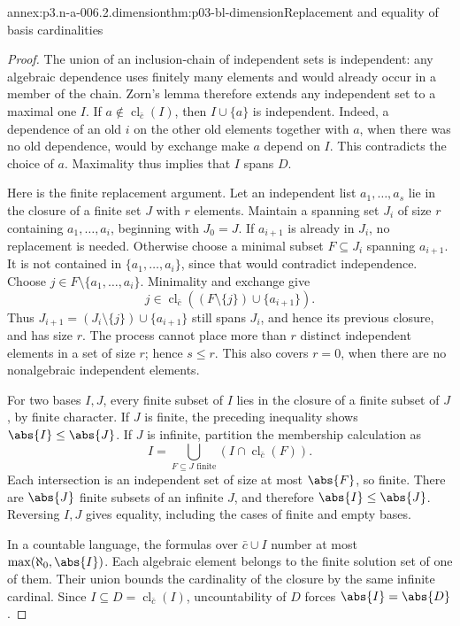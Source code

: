 \begin{annexitem}{annex:p3.n-a-006.2.dimension}{thm:p03-bl-dimension}{Replacement and equality of basis cardinalities}
\begin{proof}
The union of an inclusion-chain of independent sets is independent: any
algebraic dependence uses finitely many elements and would already occur
in a member of the chain. Zorn's lemma therefore extends any independent
set to a maximal one \(I\). If \(a\notin\operatorname{cl}_{\bar c}(I)\),
then \(I\cup\{a\}\) is independent. Indeed, a dependence of an old
\(i\) on the other old elements together with \(a\), when there was
no old dependence, would by exchange make \(a\) depend on \(I\).
This contradicts the choice of \(a\). Maximality thus implies that
\(I\) spans \(D\).

Here is the finite replacement argument. Let an independent list
\(a_1,\ldots,a_s\) lie in the closure of a finite set \(J\) with
\(r\) elements. Maintain a spanning set \(J_i\) of size \(r\)
containing \(a_1,\ldots,a_i\), beginning with \(J_0=J\).
If \(a_{i+1}\) is already in \(J_i\), no replacement is needed.
Otherwise choose a minimal subset \(F\subseteq J_i\) spanning
\(a_{i+1}\). It is not contained in \(\{a_1,\ldots,a_i\}\), since
that would contradict independence. Choose
\(j\in F\setminus\{a_1,\ldots,a_i\}\). Minimality and exchange give
\[
 j\in\operatorname{cl}_{\bar c}
       ((F\setminus\{j\})\cup\{a_{i+1}\}).
\]
Thus \(J_{i+1}=(J_i\setminus\{j\})\cup\{a_{i+1}\}\) still spans
\(J_i\), and hence its previous closure, and has size \(r\).
The process cannot place more than \(r\) distinct independent elements
in a set of size \(r\); hence \(s\leq r\). This also covers
\(r=0\), when there are no nonalgebraic independent elements.

For two bases \(I,J\), every finite subset of \(I\) lies in the
closure of a finite subset of \(J\), by finite character. If \(J\)
is finite, the preceding inequality shows \(\abs{I}\leq\abs{J}\).
If \(J\) is infinite, partition the membership calculation as
\[
 I=\bigcup_{F\subseteq J\text{ finite}}
        (I\cap\operatorname{cl}_{\bar c}(F)).
\]
Each intersection is an independent set of size at most \(\abs{F}\),
so finite. There are \(\abs{J}\) finite subsets of an infinite \(J\),
and therefore \(\abs{I}\leq\abs{J}\). Reversing \(I,J\) gives
equality, including the cases of finite and empty bases.

In a countable language, the formulas over \(\bar c\cup I\) number
at most \(\max(\aleph_0,\abs{I})\). Each algebraic element belongs
to the finite solution set of one of them. Their union bounds the
cardinality of the closure by the same infinite cardinal. Since
\(I\subseteq D=\operatorname{cl}_{\bar c}(I)\), uncountability of
\(D\) forces \(\abs{I}=\abs{D}\).
\end{proof}
\end{annexitem}


